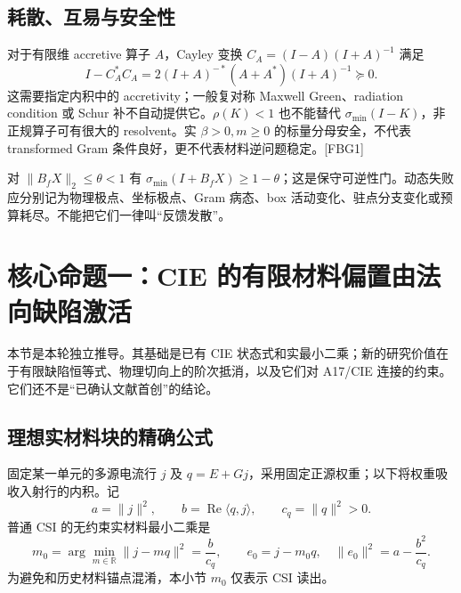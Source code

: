 \documentclass[10pt,a4paper]{article}
\begin{document}
\hypertarget{ux8017ux6563ux4e92ux6613ux4e0eux5b89ux5168ux6027}{%
\subsection{耗散、互易与安全性}\label{ux8017ux6563ux4e92ux6613ux4e0eux5b89ux5168ux6027}}

对于有限维 accretive 算子 \(A\)，Cayley 变换 \(C_A=(I-A)(I+A)^{-1}\)
满足 \[I-C_A^*C_A=2(I+A)^{-*}(A+A^*)(I+A)^{-1}\succeq0.\]
这需要指定内积中的 accretivity；一般复对称 Maxwell Green、radiation
condition 或 Schur 补不自动提供它。\(\rho(K)<1\) 也不能替代
\(\sigma_{\min}(I-K)\)，非正规算子可有很大的 resolvent。实
\(\beta>0,m\ge0\) 的标量分母安全，不代表 transformed Gram
条件良好，更不代表材料逆问题稳定。{[}FBG1{]}

对 \(\|B_fX\|_2\le\theta<1\) 有
\(\sigma_{\min}(I+B_fX)\ge1-\theta\)；这是保守可逆性门。动态失败应分别记为物理极点、坐标极点、Gram
病态、box
活动变化、驻点分支变化或预算耗尽。不能把它们一律叫``反馈发散''。

\hypertarget{ux6838ux5fc3ux547dux9898ux4e00cie-ux7684ux6709ux9650ux6750ux6599ux504fux7f6eux7531ux6cd5ux5411ux7f3aux9677ux6fc0ux6d3b}{%
\section{核心命题一：CIE
的有限材料偏置由法向缺陷激活}\label{ux6838ux5fc3ux547dux9898ux4e00cie-ux7684ux6709ux9650ux6750ux6599ux504fux7f6eux7531ux6cd5ux5411ux7f3aux9677ux6fc0ux6d3b}}

本节是本轮独立推导。其基础是已有 CIE
状态式和实最小二乘；新的研究价值在于有限缺陷恒等式、物理切向上的阶次抵消，以及它们对
A17/CIE 连接的约束。它们还不是``已确认文献首创''的结论。

\hypertarget{ux7406ux60f3ux5b9eux6750ux6599ux5757ux7684ux7cbeux786eux516cux5f0f}{%
\subsection{理想实材料块的精确公式}\label{ux7406ux60f3ux5b9eux6750ux6599ux5757ux7684ux7cbeux786eux516cux5f0f}}

固定某一单元的多源电流行 \(j\) 及
\(q=E+Gj\)，采用固定正源权重；以下将权重吸收入射行的内积。记
\[a=\|j\|^2,\qquad b=\operatorname{Re}\langle q,j\rangle,\qquad c_q=\|q\|^2>0.\]
普通 CSI 的无约束实材料最小二乘是
\[m_0=\arg\min_{m\in\mathbb R}\|j-mq\|^2=\frac b{c_q},\qquad
e_0=j-m_0q,\quad \|e_0\|^2=a-\frac{b^2}{c_q}.\]
为避免和历史材料锚点混淆，本小节 \(m_0\) 仅表示 CSI 读出。
\end{document}
